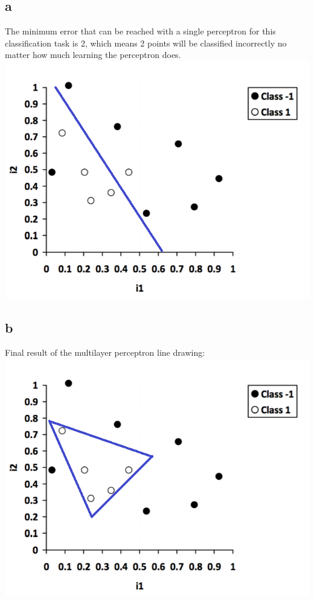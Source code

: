 \documentclass[11pt, oneside]{article}   	%
\begin{document}
\begin{flushleft}
\subsection*{a}
The minimum error that can be reached with a single perceptron for this classification task is 2, which means 2 points will be classified incorrectly no matter how much learning the perceptron does.\\
\includegraphics[]{q5_line_1.png} \\
\subsection*{b}
Final result of the multilayer perceptron line drawing: \\
\includegraphics[]{q5_mlp.png}

\end{flushleft}
\end{document}
